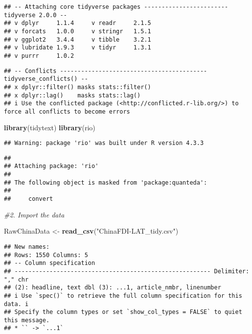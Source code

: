 \documentclass[
]{article}
\newenvironment{Shaded}{\begin{snugshade}}{\end{snugshade}}
\newcommand{\CommentTok}[1]{\textcolor[rgb]{0.56,0.35,0.01}{\textit{#1}}}
\newcommand{\FunctionTok}[1]{\textcolor[rgb]{0.13,0.29,0.53}{\textbf{#1}}}
\newcommand{\NormalTok}[1]{#1}
\newcommand{\OtherTok}[1]{\textcolor[rgb]{0.56,0.35,0.01}{#1}}
\newcommand{\StringTok}[1]{\textcolor[rgb]{0.31,0.60,0.02}{#1}}
\begin{document}
\begin{verbatim}
## -- Attaching core tidyverse packages ------------------------ tidyverse 2.0.0 --
## v dplyr     1.1.4     v readr     2.1.5
## v forcats   1.0.0     v stringr   1.5.1
## v ggplot2   3.4.4     v tibble    3.2.1
## v lubridate 1.9.3     v tidyr     1.3.1
## v purrr     1.0.2
\end{verbatim}

\begin{verbatim}
## -- Conflicts ------------------------------------------ tidyverse_conflicts() --
## x dplyr::filter() masks stats::filter()
## x dplyr::lag()    masks stats::lag()
## i Use the conflicted package (<http://conflicted.r-lib.org/>) to force all conflicts to become errors
\end{verbatim}

\begin{Shaded}
\begin{Highlighting}[]
\FunctionTok{library}\NormalTok{(tidytext)}
\FunctionTok{library}\NormalTok{(rio)}
\end{Highlighting}
\end{Shaded}

\begin{verbatim}
## Warning: package 'rio' was built under R version 4.3.3
\end{verbatim}

\begin{verbatim}
## 
## Attaching package: 'rio'
## 
## The following object is masked from 'package:quanteda':
## 
##     convert
\end{verbatim}

\begin{Shaded}
\begin{Highlighting}[]
\CommentTok{\#2. Import the data}

\NormalTok{RawChinaData }\OtherTok{\textless{}{-}} \FunctionTok{read\_csv}\NormalTok{(}\StringTok{"ChinaFDI{-}LAT\_tidy.csv"}\NormalTok{)}
\end{Highlighting}
\end{Shaded}

\begin{verbatim}
## New names:
## Rows: 1550 Columns: 5
## -- Column specification
## -------------------------------------------------------- Delimiter: "," chr
## (2): headline, text dbl (3): ...1, article_nmbr, linenumber
## i Use `spec()` to retrieve the full column specification for this data. i
## Specify the column types or set `show_col_types = FALSE` to quiet this message.
## * `` -> `...1`
\end{verbatim}
\end{document}
